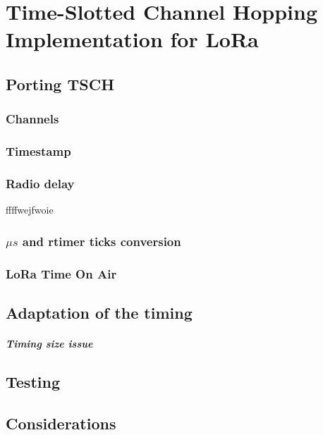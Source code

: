 \chapter{Time-Slotted Channel Hopping Implementation for LoRa\label{section:tsch}}

\section{Porting TSCH}

\subsection{Channels}

\subsection{Timestamp}

\subsection{Radio delay}
ffffwejfwoie

\subsection{$\mu s$ and rtimer ticks conversion}

\subsection{LoRa Time On Air}

\section{Adaptation of the timing}

\paragraph{Timing size issue}

\section{Testing}

\section{Considerations}
